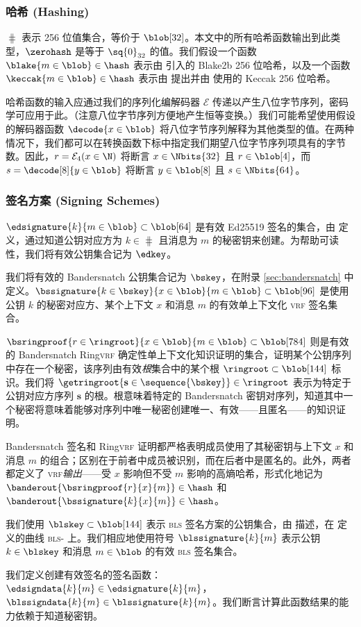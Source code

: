 \subsubsection{哈希 (Hashing)}

$\hash$ 表示 256 位值集合，等价于 $\blob[32]$。本文中的所有哈希函数输出到此类型，$\zerohash$ 是等于 $\sq{0}_{32}$ 的值。我们假设一个函数 $\blake{m \in \blob} \in \hash$ 表示由 \cite{rfc7693} 引入的 Blake2b 256 位哈希，以及一个函数 $\keccak{m \in \blob} \in \hash$ 表示由 \cite{bertoni2013keccak} 提出并由 \cite{wood2014ethereum} 使用的 Keccak 256 位哈希。

哈希函数的输入应通过我们的序列化编解码器 $\mathcal{E}$ 传递以产生八位字节序列，密码学可应用于此。（注意八位字节序列方便地产生恒等变换。）我们可能希望使用假设的解码器函数 $\decode{x \in \blob}$ 将八位字节序列解释为其他类型的值。在两种情况下，我们都可以在转换函数下标中指定我们期望八位字节序列项具有的字节数。因此，$r = \mathcal{E}_4(x \in \N)$ 将断言 $x \in \Nbits{32}$ 且 $r \in \blob[4]$，而 $s = \decode[8]{y \in \blob}$ 将断言 $y \in \blob[8]$ 且 $s \in \Nbits{64}$。

\subsubsection{签名方案 (Signing Schemes)}\label{sec:signing}

$\edsignature{k}{m \in \blob} \subset \blob[64]$ 是有效 Ed25519 签名的集合，由 \cite{rfc8032} 定义，通过知道公钥对应方为 $k \in \hash$ 且消息为 $m$ 的秘密钥来创建。为帮助可读性，我们将有效公钥集合记为 $\edkey$。

我们将有效的 Bandersnatch 公钥集合记为 $\bskey$，在附录 \ref{sec:bandersnatch} 中定义。$\bssignature{k \in \bskey}{x \in \blob}{m \in \blob} \subset \blob[96]$ 是使用公钥 $k$ 的秘密对应方、某个上下文 $x$ 和消息 $m$ 的有效单上下文化 \textsc{vrf} 签名集合。

$\bsringproof{r \in \ringroot}{x \in \blob}{m \in \blob} \subset \blob[784]$ 则是有效的 Bandersnatch Ring\textsc{vrf} 确定性单上下文化知识证明的集合，证明某个公钥序列中存在一个秘密，该序列由有效\emph{根}集合中的某个根 $\ringroot \subset \blob[144]$ 标识。我们将 $\getringroot{\mathbf{s} \in \sequence{\bskey}} \in \ringroot$ 表示为特定于公钥对应方序列 $\mathbf{s}$ 的根。根意味着特定的 Bandersnatch 密钥对序列，知道其中一个秘密将意味着能够对序列中唯一秘密创建唯一、有效——且匿名——的知识证明。

Bandersnatch 签名和 Ring\textsc{vrf} 证明都严格表明成员使用了其秘密钥与上下文 $x$ 和消息 $m$ 的组合；区别在于前者中成员被识别，而在后者中是匿名的。此外，两者都定义了 \textsc{vrf}\emph{输出}——受 $x$ 影响但不受 $m$ 影响的高熵哈希，形式化地记为 $\banderout{\bsringproof{r}{x}{m}} \in \hash$ 和 $\banderout{\bssignature{k}{x}{m}} \in \hash$。

我们使用 $\blskey \subset \blob[144]$ 表示 \textsc{bls} 签名方案的公钥集合，由 \cite{jofc-2004-14130} 描述，在 \cite{bls12-381} 定义的曲线 \textsc{bls}- 上。我们相应地使用符号 $\blssignature{k}{m}$ 表示公钥 $k \in \blskey$ 和消息 $m \in \blob$ 的有效 \textsc{bls} 签名集合。

我们定义创建有效签名的签名函数：$\edsigndata{k}{m} \in \edsignature{k}{m}$，$\blssigndata{k}{m} \in \blssignature{k}{m}$。我们断言计算此函数结果的能力依赖于知道秘密钥。
